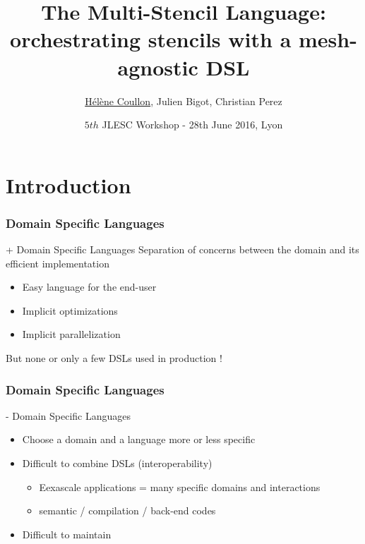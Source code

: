 \documentclass{beamer}
\title[The Multi-Stencil Language]{The Multi-Stencil Language: orchestrating stencils with a mesh-agnostic DSL}
\author[Hélène Coullon (INRIA), Julien Bigot (CEA), Christian Perez (INRIA)]{\underline{Hélène Coullon}, Julien Bigot, Christian Perez}
\institute[INRIA]{INRIA team Avalon\\Maison de la simulation (CEA)}
\date{$5{th}$ JLESC Workshop - 28th June 2016, Lyon}
\begin{document}

\begin{frame}
    \titlepage
\end{frame}

\section{Introduction}
\begin{frame}
\frametitle{Domain Specific Languages} %
\begin{block}{+ Domain Specific Languages}
Separation of concerns between the domain and its efficient implementation
\begin{itemize}
\item Easy language for the end-user
\item Implicit optimizations
\item Implicit parallelization
\end{itemize}
\end{block}
But none or only a few DSLs used in production !
\end{frame}
\begin{frame}
\frametitle{Domain Specific Languages} %
\begin{alertblock}{- Domain Specific Languages}
\begin{itemize}
\item Choose a domain and a language more or less specific
\item Difficult to combine DSLs (interoperability)
\begin{itemize}
\item Eexascale applications = many specific domains and interactions
\item semantic / compilation / back-end codes
\end{itemize}
\item Difficult to maintain
\end{itemize}
\end{alertblock}
\end{frame}
\end{document}

